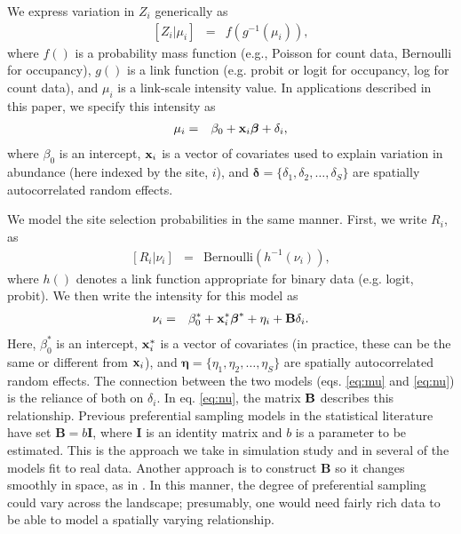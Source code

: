 \documentclass[times,mee,doublespace,]{besauth2}
\begin{document}
\begin{flushleft}
\hspace{0.5in} We express variation in $Z_i$ generically as
\begin{eqnarray}
  \label{eq:process}
  [Z_i|\mu_i] & = & f(g^{-1}(\mu_i)),
\end{eqnarray}
where $f()$ is a probability mass function (e.g., Poisson for count data, Bernoulli for occupancy), $g()$ is a link function (e.g. probit or logit for occupancy, log for count data), and $\mu_i$ is a link-scale intensity value.  In applications described in this paper, we specify this intensity as
\begin{eqnarray}
\mu_i & = & \beta_0 + {\bf x}_i \boldsymbol{\beta}+\delta_i,
 \label{eq:mu}
\end{eqnarray}
where $\beta_0$ is an intercept, ${\bf x}_i$ is a vector of covariates used to explain variation in abundance (here indexed by the site, $i$), and $\boldsymbol{\delta}=\{ \delta_1,\delta_2,\hdots,\delta_S \}$ are spatially autocorrelated random effects.

\hspace{0.5in} We model the site selection probabilities in the same manner.  First, we write $R_i$, as
\begin{eqnarray}
 \label{eq:R}
  [R_i|\nu_i] & = & \text{Bernoulli}(h^{-1}(\nu_i)),
\end{eqnarray}
where $h()$ denotes a link function appropriate for binary data (e.g. logit, probit).  We then write the intensity for this model as
\begin{eqnarray}
  \label{eq:nu}
  \nu_i & = & \beta_0^* + {\bf x}_i^* \boldsymbol{\beta}^*+\eta_i+{\bf B} \delta_i.
\label{eq:nu}
\end{eqnarray}
Here, $\beta_0^*$ is an intercept, ${\bf x}_i^*$ is a vector of covariates (in practice, these can be the same or different from ${\bf x}_i$), and $\boldsymbol{\eta}=\{ \eta_1,\eta_2,\hdots,\eta_S \}$ are spatially autocorrelated random effects.  The connection between the two models (eqs. \ref{eq:mu} and \ref{eq:nu}) is the reliance of both on $\delta_i$.  In eq. \ref{eq:nu}, the matrix ${\bf B}$ describes this relationship.  Previous preferential sampling models in the statistical literature have set $\textbf{B} = b \textbf{I}$, where $\textbf{I}$ is an identity matrix and $b$ is a parameter to be estimated.  This is the approach we take in simulation study and in several of the models fit to real data.  Another approach is to construct $\textbf{B}$ so it changes smoothly in space, as in \citep{RoyleBerliner1999}.  In this manner, the degree of preferential sampling could vary across the landscape; presumably, one would need fairly rich data to be able to model a spatially varying relationship.


\end{flushleft}
\end{document}
